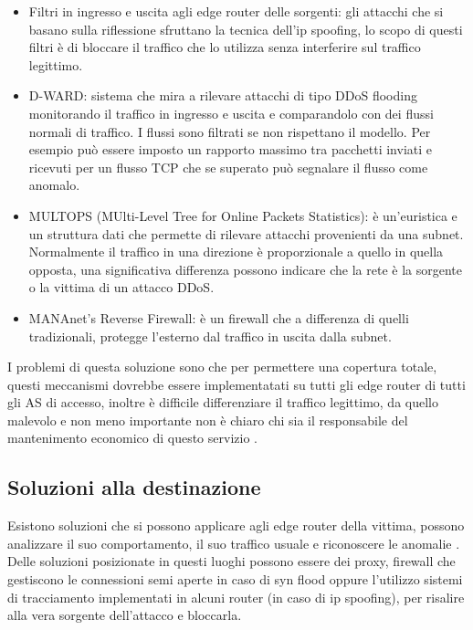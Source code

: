 \begin{itemize}
    \item Filtri in ingresso e uscita agli edge router delle sorgenti: gli attacchi che si basano sulla riflessione sfruttano la tecnica dell'ip spoofing, lo scopo di questi filtri è di bloccare il traffico che lo utilizza senza interferire sul traffico legittimo.
    \item D-WARD: sistema che mira a rilevare attacchi di tipo DDoS flooding monitorando il traffico in ingresso e uscita e comparandolo con dei flussi normali di traffico. I flussi sono filtrati se non rispettano il modello. Per esempio può essere imposto un rapporto massimo tra pacchetti inviati e ricevuti per un flusso TCP che se superato può segnalare il flusso come anomalo.
    \item MULTOPS (MUlti-Level Tree for Online Packets Statistics): è un'euristica e un struttura dati che permette di rilevare attacchi provenienti da una subnet. Normalmente il traffico in una direzione è proporzionale a quello in quella opposta, una significativa differenza possono indicare che la rete è la sorgente o la vittima di un attacco DDoS.
    \item MANAnet’s Reverse Firewall: è un firewall che a differenza di quelli tradizionali, protegge l'esterno dal traffico in uscita dalla subnet.
\end{itemize}

I problemi di questa soluzione sono che per permettere una copertura totale, questi meccanismi dovrebbe essere implementatati su tutti gli edge router di tutti gli AS di accesso, inoltre è difficile differenziare il traffico legittimo, da quello malevolo e non meno importante non è chiaro chi sia il responsabile del mantenimento economico di questo servizio \cite{ddos_survey_1}.

\subsection{Soluzioni alla destinazione}

Esistono soluzioni che si possono applicare agli edge router della vittima, possono analizzare il suo comportamento, il suo traffico usuale e riconoscere le anomalie \cite{ddos_survey_1,ddos_survey_2}.
Delle soluzioni posizionate in questi luoghi possono essere dei proxy, firewall che gestiscono le connessioni semi aperte in caso di syn flood oppure l'utilizzo sistemi di tracciamento implementati in alcuni router (in caso di ip spoofing), per risalire alla vera sorgente dell'attacco e bloccarla. %

